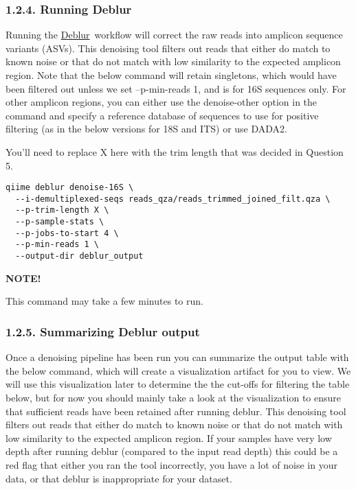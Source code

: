 \documentclass[
]{book}
\newenvironment{greenbox}{
  \definecolor{shadecolor}{RGB}{141, 181, 128}
  \color{white}
  \begin{shaded}}
 {\end{shaded}}
\begin{document}
\subsubsection{1.2.4. Running Deblur}\label{running-deblur}

Running the \href{https://github.com/biocore/deblur}{Deblur}~workflow will correct the raw reads into amplicon sequence variants (ASVs). This denoising tool filters out reads that either do match to known noise or that do not match with low similarity to the expected amplicon region. Note that the below command will retain singletons, which would have been filtered out unless we set --p-min-reads 1, and is for 16S sequences only. For other amplicon regions, you can either use the denoise-other option in the command and specify a reference database of sequences to use for positive filtering (as in the below versions for 18S and ITS) or use DADA2.

You'll need to replace X here with the trim length that was decided in Question 5.

\begin{verbatim}
qiime deblur denoise-16S \
  --i-demultiplexed-seqs reads_qza/reads_trimmed_joined_filt.qza \
  --p-trim-length X \
  --p-sample-stats \
  --p-jobs-to-start 4 \
  --p-min-reads 1 \
  --output-dir deblur_output
\end{verbatim}

\begin{greenbox}

\begin{center}
\textbf{NOTE!}

\end{center}

This command may take a few minutes to run.

\end{greenbox}

\subsubsection{1.2.5. Summarizing Deblur output}\label{summarizing-deblur-output}

Once a denoising pipeline has been run you can summarize the output table with the below command, which will create a visualization artifact for you to view. We will use this visualization later to determine the the cut-offs for filtering the table below, but for now you should mainly take a look at the visualization to ensure that sufficient reads have been retained after running deblur. This denoising tool filters out reads that either do match to known noise or that do not match with low similarity to the expected amplicon region. If your samples have very low depth after running deblur (compared to the input read depth) this could be a red flag that either you ran the tool incorrectly, you have a lot of noise in your data, or that deblur is inappropriate for your dataset.
\end{document}
